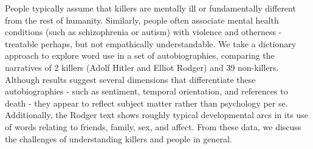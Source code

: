 People typically assume that killers are mentally ill or fundamentally different from the rest of humanity. Similarly, people often associate mental health conditions (such as schizophrenia or autism) with violence and otherness - treatable perhaps, but not empathically understandable. We take a dictionary approach to explore word use in a set of autobiographies, comparing the narratives of 2 killers (Adolf Hitler and Elliot Rodger) and 39 non-killers. Although results suggest several dimensions that differentiate these autobiographies - such as sentiment, temporal orientation, and references to death - they appear to reflect subject matter rather than psychology per se. Additionally, the Rodger text shows roughly typical developmental arcs in its use of words relating to friends, family, sex, and affect. From these data, we discuss the challenges of understanding killers and people in general.
